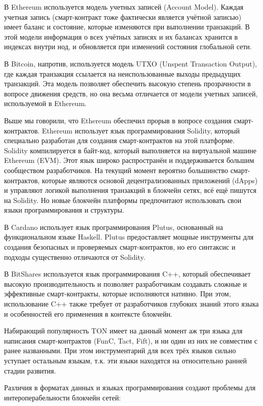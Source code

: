 В Ethereum используется модель учетных записей (Account Model). Каждая учетная запись (смарт-контракт тоже фактически является учётной записью) имеет баланс и состояние, которые изменяются при выполнении транзакций. В этой модели информация о всех учётных записях и их балансах хранится в индексах внутри нод, и обновляется при изменений состояния глобальной сети.

В Bitcoin, напротив, используется модель UTXO (Unspent Transaction Output), где каждая транзакция ссылается на неиспользованные выходы предыдущих транзакций. Эта модель позволяет обеспечить высокую степень прозрачности в вопросе движения средств, но она весьма отличается от модели учетных записей, используемой в Ethereum.

Выше мы говорили, что Ethereum обеспечил прорыв в вопросе создания смарт-контрактов. Ethereum использует язык программирования Solidity, который специально разработан для создания смарт-контрактов на этой платформе. Solidity компилируется в байт-код, который выполняется на виртуальной машине Ethereum (EVM). Этот язык широко распространён и поддерживается большим сообществом разработчиков. На текущий момент вероятно большинство смарт-контрактов, которые являются основой децентрализованных приложений (dApps) и управляют логикой выполнения транзакций в блокчейн сетях, всё ещё пишутся на Solidity. Но новые блокчейн платформы предпочитают использовать свои языки программирования и структуры.

В Cardano использует язык программирования Plutus, основанный на функциональном языке Haskell. Plutus предоставляет мощные инструменты для создания безопасных и проверяемых смарт-контрактов, но его синтаксис и подходы существенно отличаются от Solidity.

В BitShares используется язык программирования C++, который обеспечивает высокую производительность и позволяет разработчикам создавать сложные и эффективные смарт-контракты, которые исполняются нативно. При этом, использование C++ также требует от разработчиков глубоких знаний этого языка и особенностей его применения в контексте блокчейн.

Набирающий популярность TON имеет на данный момент аж три языка для написания смарт-контрактов (FunC, Tact, Fift), и ни один из них не совместим с ранее названными\cite{label21}. При этом инструментарий для всех трёх языков сильно уступает остальным языкам, т.к. эти языки находятся на относительно ранней стадии развития.

Различия в форматах данных и языках программирования создают проблемы для интероперабельности блокчейн сетей:

